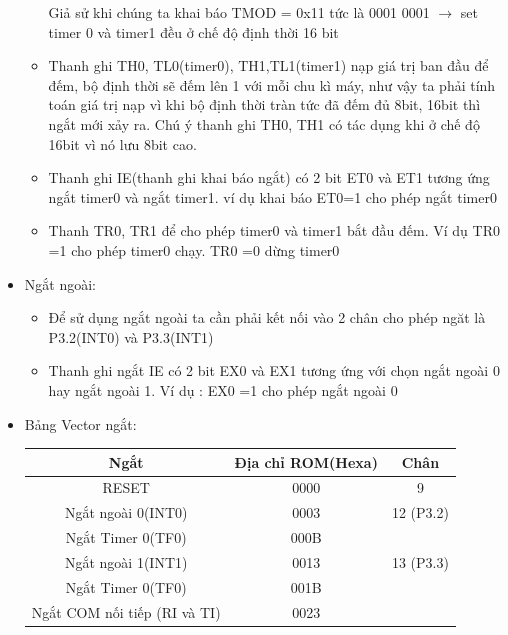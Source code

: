 \documentclass[../report.tex]{subfiles}
\begin{document}
\begin{itemize}
\begin{itemize}
            Giả sử khi chúng ta khai báo TMOD = 0x11 tức là 0001 0001 $\rightarrow$ set timer 0 và timer1 đều ở chế độ định thời 16 bit
            \item Thanh ghi TH0, TL0(timer0), TH1,TL1(timer1) nạp giá trị ban đầu để đếm, bộ định thời sẽ đếm lên 1 với mỗi chu kì máy, như vậy ta phải tính toán giá trị nạp vì khi bộ định thời tràn tức đã đếm đủ 8bit, 16bit thì ngắt mới xảy ra. Chú ý thanh ghi TH0, TH1 có tác dụng khi ở chế độ 16bit vì nó lưu 8bit cao.
            \item Thanh ghi IE(thanh ghi khai báo ngắt) có 2 bit ET0 và ET1 tương ứng ngắt timer0 và ngắt timer1. ví dụ khai báo ET0=1 cho phép ngắt timer0
            \item Thanh TR0, TR1 để cho phép timer0 và timer1 bắt đầu đếm. Ví dụ TR0 =1 cho phép timer0 chạy. TR0 =0 dừng timer0
        \end{itemize}

    \item Ngắt ngoài:
        \begin{itemize}
            \item Để sử dụng ngắt ngoài ta cần phải kết nối vào 2 chân cho phép ngăt là P3.2(INT0) và P3.3(INT1)
            \item Thanh ghi ngắt IE có 2 bit EX0 và EX1 tương ứng với chọn ngắt ngoài 0 hay ngắt ngoài 1. Ví dụ : EX0 =1 cho phép ngắt ngoài 0
        \end{itemize}

    \item Bảng Vector ngắt:
        \begin{center}
                    \begin{tabular}{ |c|c|c|} 
                    \hline
                    Ngắt & Địa chỉ ROM(Hexa) & Chân\\
                    \hline
                    RESET & 0000 & 9 \\
                    Ngắt ngoài 0(INT0) & 0003 & 12 (P3.2) \\
                    Ngắt Timer 0(TF0) & 000B & \\
                    Ngắt ngoài 1(INT1) & 0013 & 13 (P3.3) \\ 
                    Ngắt Timer 0(TF0) & 001B & \\
                    Ngắt COM nối tiếp (RI và TI) & 0023 & \\
                    \hline
                    \end{tabular}
                    

\end{center}
\end{itemize}
\end{document}
